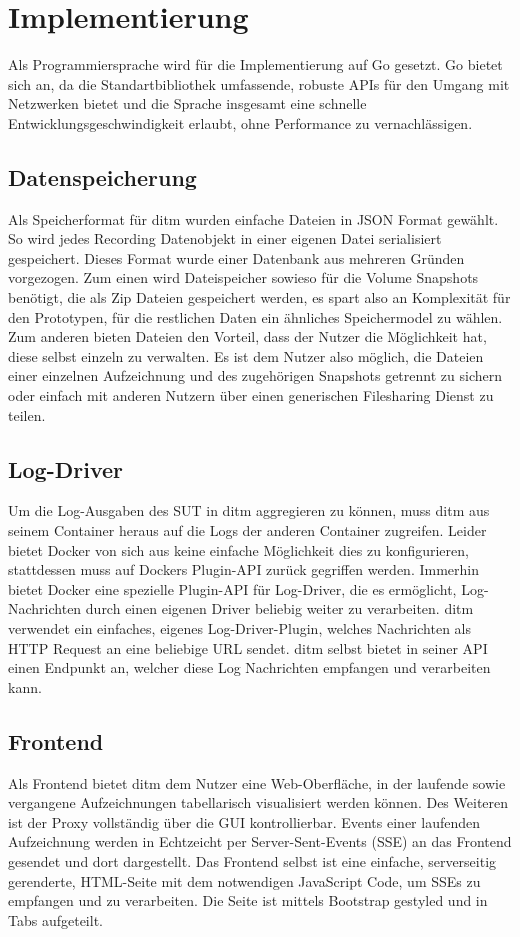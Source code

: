 \documentclass[12pt,a4paper]{report}
\begin{document}
\section{Implementierung}
Als Programmiersprache wird für die Implementierung auf Go gesetzt. Go bietet sich an, da die Standartbibliothek
umfassende, robuste APIs für den Umgang mit Netzwerken bietet und die Sprache insgesamt eine schnelle
Entwicklungsgeschwindigkeit erlaubt, ohne Performance zu vernachlässigen.
\subsection{Datenspeicherung}
Als Speicherformat für ditm wurden einfache Dateien in JSON Format gewählt. So wird jedes Recording Datenobjekt in
einer eigenen Datei serialisiert gespeichert. Dieses Format wurde einer Datenbank aus mehreren Gründen vorgezogen.
Zum einen wird Dateispeicher sowieso für die Volume Snapshots benötigt, die als Zip Dateien gespeichert werden,
es spart also an Komplexität für den Prototypen, für die restlichen Daten ein ähnliches Speichermodel zu wählen.
Zum anderen bieten Dateien den Vorteil, dass der Nutzer die Möglichkeit hat, diese selbst einzeln zu verwalten.
Es ist dem Nutzer also möglich, die Dateien einer einzelnen Aufzeichnung und des zugehörigen Snapshots getrennt
zu sichern oder einfach mit anderen Nutzern über einen generischen Filesharing Dienst zu teilen.
\subsection{Log-Driver}
Um die Log-Ausgaben des SUT in ditm aggregieren zu können, muss ditm aus seinem Container heraus auf die Logs der
anderen Container zugreifen. Leider bietet Docker von sich aus keine einfache Möglichkeit dies zu konfigurieren,
stattdessen muss auf Dockers Plugin-API zurück gegriffen werden. Immerhin bietet Docker eine spezielle Plugin-API
für Log-Driver, die es ermöglicht, Log-Nachrichten durch einen eigenen Driver beliebig weiter zu verarbeiten.
ditm verwendet ein einfaches, eigenes Log-Driver-Plugin, welches Nachrichten als HTTP Request an eine beliebige URL
sendet. ditm selbst bietet in seiner API einen Endpunkt an, welcher diese Log Nachrichten empfangen und verarbeiten kann.
\subsection{Frontend}
Als Frontend bietet ditm dem Nutzer eine Web-Oberfläche, in der laufende sowie vergangene Aufzeichnungen tabellarisch visualisiert
werden können. Des Weiteren ist der Proxy vollständig über die GUI kontrollierbar. Events einer laufenden Aufzeichnung werden in
Echtzeicht per Server-Sent-Events (SSE) an das Frontend gesendet und dort dargestellt. Das Frontend selbst ist eine einfache,
serverseitig gerenderte, HTML-Seite mit dem notwendigen JavaScript Code, um SSEs zu empfangen und zu verarbeiten. Die Seite ist
mittels Bootstrap gestyled und in Tabs aufgeteilt.
\end{document}
